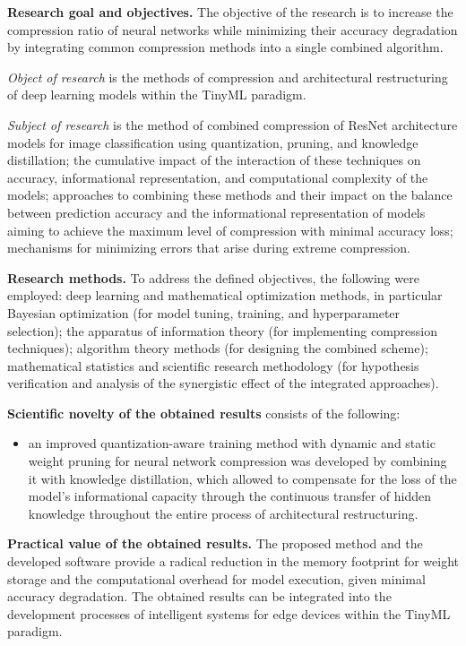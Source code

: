 \documentclass{pma-mthesis}
\begin{document}
\textbf{Research goal and objectives.} The objective of the research is to increase the compression ratio of neural networks while minimizing their accuracy degradation by integrating common compression methods into a single combined algorithm.

\textit{Object of research} is the methods of compression and architectural restructuring of deep learning models within the TinyML paradigm.

\textit{Subject of research} is the method of combined compression of ResNet architecture models for image classification using quantization, pruning, and knowledge distillation; the cumulative impact of the interaction of these techniques on accuracy, informational representation, and computational complexity of the models; approaches to combining these methods and their impact on the balance between prediction accuracy and the informational representation of models aiming to achieve the maximum level of compression with minimal accuracy loss; mechanisms for minimizing errors that arise during extreme compression.

\textbf{Research methods.} To address the defined objectives, the following were employed: deep learning and mathematical optimization methods, in particular Bayesian optimization (for model tuning, training, and hyperparameter selection); the apparatus of information theory (for implementing compression techniques); algorithm theory methods (for designing the combined scheme); mathematical statistics and scientific research methodology (for hypothesis verification and analysis of the synergistic effect of the integrated approaches).

\textbf{Scientific novelty of the obtained results} consists of the following:
    \begin{itemize}[label=--, partopsep=0pt, parsep=0pt, topsep=0pt, itemsep=0pt, itemindent=1.7cm, leftmargin=0pt]
        \item an improved quantization-aware training method with dynamic and static weight pruning for neural network compression was developed by combining it with knowledge distillation, which allowed to compensate for the loss of the model's informational capacity through the continuous transfer of hidden knowledge throughout the entire process of architectural restructuring.
    \end{itemize}

\textbf{Practical value of the obtained results.} The proposed method and the developed software provide a radical reduction in the memory footprint for weight storage and the computational overhead for model execution, given minimal accuracy degradation. The obtained results can be integrated into the development processes of intelligent systems for edge devices within the TinyML paradigm.
\end{document}
